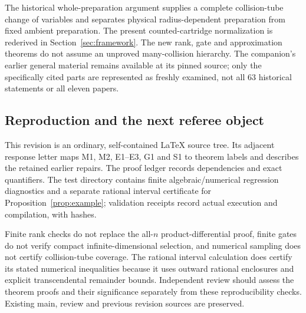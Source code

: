 The historical whole-preparation argument supplies a complete collision-tube change of variables and separates physical radius-dependent preparation from fixed ambient preparation. The present counted-cartridge normalization is rederived in Section~\ref{sec:framework}. The new rank, gate and approximation theorems do not assume an unproved many-collision hierarchy. The companion's earlier general material remains available at its pinned source; only the specifically cited parts are represented as freshly examined, not all 63 historical statements or all eleven papers.

\subsection{Reproduction and the next referee object}
This revision is an ordinary, self-contained LaTeX source tree. Its adjacent response letter maps M1, M2, E1--E3, G1 and S1 to theorem labels and describes the retained earlier repairs. The proof ledger records dependencies and exact quantifiers. The test directory contains finite algebraic/numerical regression diagnostics and a separate rational interval certificate for Proposition~\ref{prop:example}; validation receipts record actual execution and compilation, with hashes.

Finite rank checks do not replace the all-$n$ product-differential proof, finite gates do not verify compact infinite-dimensional selection, and numerical sampling does not certify collision-tube coverage. The rational interval calculation does certify its stated numerical inequalities because it uses outward rational enclosures and explicit transcendental remainder bounds. Independent review should assess the theorem proofs and their significance separately from these reproducibility checks. Existing main, review and previous revision sources are preserved.
